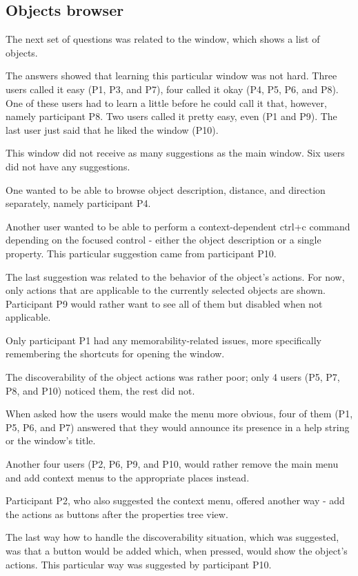 \documentclass[nolof,digital]{fithesis3}
\begin{document}
\subsection{Objects browser}
The next set of questions was related to the window, which shows a list of objects.

The answers showed that learning this particular window was not hard. Three users called it easy (P1, P3, and P7), four called it okay (P4, P5, P6, and P8). One of these users had to learn a little before he could call it that, however, namely participant P8. Two users called it pretty easy, even (P1 and P9). The last user just said that he liked the window (P10).

This window did not receive as many suggestions as the main window. Six users did not have any suggestions.

One wanted to be able to browse object description, distance, and direction separately, namely participant P4.

Another user wanted to be able to perform a context-dependent ctrl+c command depending on the focused control - either the object description or a single property. This particular suggestion came from participant P10.

The last suggestion was related to the behavior of the object's actions. For now, only actions that are applicable to the currently selected objects are shown. Participant P9 would rather want to see all of them but disabled when not applicable.

Only participant P1 had any memorability-related issues, more specifically remembering the shortcuts for opening the window.

The discoverability of the object actions was rather poor; only 4 users (P5, P7, P8, and P10) noticed them, the rest did not.

When asked how the users would make the menu more obvious, four of them (P1, P5, P6, and P7) answered that they would announce its presence in a help string or the window's title.

Another four users (P2, P6, P9, and P10, would rather remove the main menu and add context menus to the appropriate places instead.

Participant P2, who also suggested the context menu, offered another way - add the actions as buttons after the properties tree view.

The last way how to handle the discoverability situation, which was suggested, was that a button would be added which, when pressed, would show the object's actions. This particular way was suggested by participant P10.
\end{document}
